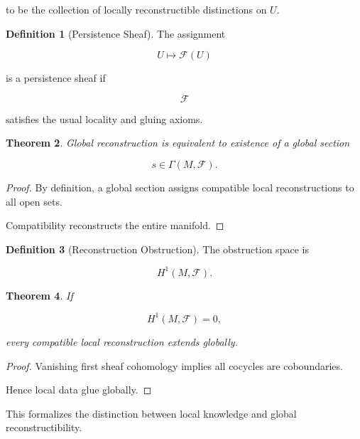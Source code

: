 \documentclass[12pt,oneside]{article}
\newtheorem{theorem}{Theorem}[section] \newtheorem{lemma}[theorem]{Lemma} \newtheorem{proposition}[theorem]{Proposition} \newtheorem{corollary}[theorem]{Corollary}
\theoremstyle{definition}
\newtheorem{definition}[theorem]{Definition} \newtheorem{axiom}[theorem]{Axiom} \newtheorem{remark}[theorem]{Remark} \newtheorem{example}[theorem]{Example}
\begin{document}
to be the collection of locally reconstructible distinctions on \(U\).

\begin{definition}[Persistence Sheaf]

The assignment

\[
U
\mapsto
\mathcal F(U)
\]

is a persistence sheaf if

\[
\mathcal F
\]

satisfies the usual locality and gluing axioms.

\end{definition}

\begin{theorem}

Global reconstruction is equivalent to existence of a global section

\[
s
\in
\Gamma(M,\mathcal F).
\]

\end{theorem}

\begin{proof}

By definition, a global section assigns compatible local reconstructions to all open sets.

Compatibility reconstructs the entire manifold.

\end{proof}

\begin{definition}[Reconstruction Obstruction]

The obstruction space is

\[
H^1(M,\mathcal F).
\]

\end{definition}

\begin{theorem}

If

\[
H^1(M,\mathcal F)=0,
\]

every compatible local reconstruction extends globally.

\end{theorem}

\begin{proof}

Vanishing first sheaf cohomology implies all cocycles are coboundaries.

Hence local data glue globally.

\end{proof}

This formalizes the distinction between local knowledge and global reconstructibility.
\end{document}
